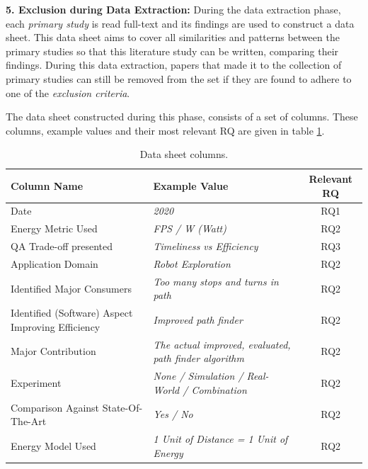 \vspace{5mm}

\noindent\textbf{5. Exclusion during Data Extraction:}
During the data extraction phase, each \textit{primary study} is read full-text and its findings are used to construct a data sheet.
This data sheet aims to cover all similarities and patterns between the primary studies so that this literature study can be written, comparing their findings.
During this data extraction, papers that made it to the collection of primary studies can still be removed from the set if they are found to adhere to one of the \textit{exclusion criteria}.

The data sheet constructed during this phase, consists of a set of columns. 
These columns, example values and their most relevant RQ are given in table \ref{table:data_sheet}.

\begin{table}[t]
    \centering
    \caption{Data sheet columns.}
    \begin{tabular}{llc}
        \toprule
            Column Name & 
            Example Value & 
            Relevant RQ  \\
        \midrule
            Date & 
                \textit{2020} & 
                RQ1 \\
            Energy Metric Used & 
                \textit{FPS / W (Watt)} & 
                RQ2 \\
            QA Trade-off presented & 
                \textit{Timeliness vs Efficiency} & 
                RQ3 \\
            Application Domain & 
                \textit{Robot Exploration} & 
                RQ2 \\
            Identified Major Consumers & 
                \textit{Too many stops and turns in path} & 
                RQ2 \\
            Identified (Software) Aspect Improving Efficiency & 
                \textit{Improved path finder} & 
                RQ2 \\
            Major Contribution & 
                \textit{The actual improved, evaluated, path finder algorithm} & 
                RQ2 \\
            Experiment & 
                \textit{None / Simulation / Real-World / Combination} & 
                RQ2 \\
            Comparison Against State-Of-The-Art & 
                \textit{Yes / No} & 
                RQ2 \\
            Energy Model Used &
                \textit{1 Unit of Distance = 1 Unit of Energy} & 
                RQ2 \\
        \bottomrule
    \end{tabular}
    \label{table:data_sheet}
\end{table}

